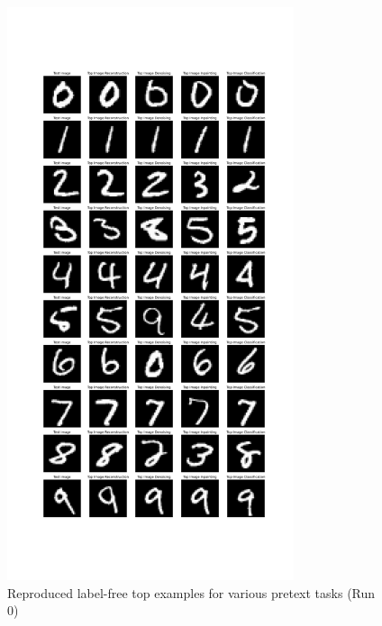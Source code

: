     \begin{figure}
        \centering
        \includegraphics[width=0.75\textwidth]{images/feature_imp/top_examples_run0.pdf}
        \caption{Reproduced label-free top examples for various pretext tasks (Run 0)}
        \label{fig:my_label}
    \end{figure}

    